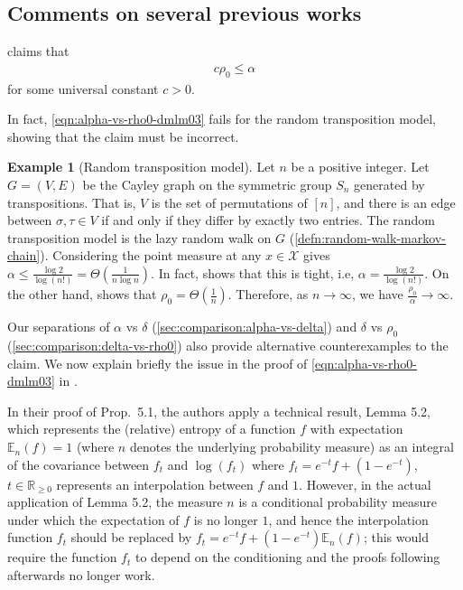 \documentclass[11pt]{article}
\def\bE{\mathbb{E}}
\def\bR{\mathbb{R}}
\def\cX{\mathcal{X}}
\theoremstyle{definition}
\newtheorem{example}[theorem]{Example}
\begin{document}
\subsection{Comments on several previous works} \label{sec:comparison:error-in-dmlm}
\cite[Prop.~5.1]{del2003contraction} claims that
\begin{align} \label{eqn:alpha-vs-rho0-dmlm03}
  c \rho_0 \le \alpha
\end{align}
for some universal constant $c>0$.
{%
In fact, \cref{eqn:alpha-vs-rho0-dmlm03} fails for the random transposition model, showing that the claim must be incorrect.
\begin{example}[Random transposition model] \label{ex:random-transposition}
  Let $n$ be a positive integer.
  Let $G=(V,E)$ be the Cayley graph on the symmetric group $S_n$ generated by transpositions. That is, $V$ is the set of permutations of $[n]$, and there is an edge between $\sigma,\tau\in V$ if and only if they differ by exactly two entries. The random transposition model is the lazy random walk on $G$ (\cref{defn:random-walk-markov-chain}).
  Considering the point measure at any $x\in \cX$ gives $\alpha\le \frac{\log 2}{\log (n!)} = \Theta\left(\frac 1{n\log n}\right)$.
  In fact, \cite[Theorem 1.9]{bristiel2024entropy} shows that this is tight, i.e, $\alpha = \frac{\log 2}{\log (n!)}$.
  On the other hand, \cite{gao2003exponential} shows that $\rho_0 = \Theta\left(\frac 1n\right)$.
  Therefore, as $n\to \infty$, we have $\frac{\rho_0}{\alpha} \to \infty$.
\end{example}
Our separations of $\alpha$ vs $\delta$ (\cref{sec:comparison:alpha-vs-delta}) and $\delta$ vs $\rho_0$ (\cref{sec:comparison:delta-vs-rho0}) also provide alternative counterexamples to the claim.
We now explain briefly the issue in the proof of \cref{eqn:alpha-vs-rho0-dmlm03} in \cite{del2003contraction}.
}
In their proof of Prop.~5.1, the authors apply a technical result, Lemma 5.2, which represents the (relative) entropy of a function $f$ with expectation $\bE_n(f)=1$ (where $n$ denotes the underlying probability measure) as an integral of the covariance between $f_t$ and $\log(f_t)$ where $f_t = e^{-t} f + (1-e^{-t})$, $t \in \bR_{\ge 0}$ represents an interpolation between $f$ and $1$.
However, in the actual application of Lemma 5.2, the measure $n$ is a conditional probability measure under which the expectation of $f$ is no longer $1$, and hence the interpolation function $f_t$ should be replaced by $f_t = e^{-t} f + (1-e^{-t}) \bE_n(f)$; this would require the function $f_t$ to depend on the conditioning and the proofs following afterwards no longer work.
\end{document}
